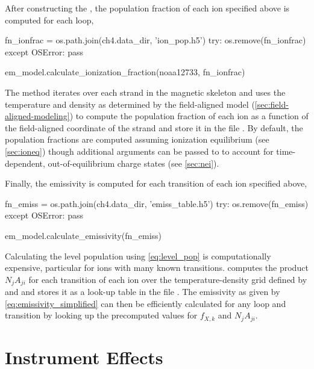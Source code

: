 After constructing the , the population fraction of each ion specified above is computed for each loop,
\begin{pycode}[chapter4]
fn_ionfrac = os.path.join(ch4.data_dir, 'ion_pop.h5')
try:
    os.remove(fn_ionfrac)
except OSError:
    pass
\end{pycode}
\begin{pyblock}[chapter4][baselinestretch=1,xleftmargin=3em]
em_model.calculate_ionization_fraction(noaa12733, fn_ionfrac)
\end{pyblock}
The  method iterates over each strand in the magnetic skeleton and uses the temperature and density as determined by the field-aligned model (\autoref{sec:field-aligned-modeling}) to compute the population fraction of each ion as a function of the field-aligned coordinate of the strand and store it in the file . By default, the population fractions are computed assuming ionization equilibrium (see \autoref{sec:ioneq}) though additional arguments can be passed to  to account for time-dependent, out-of-equilibrium charge states (see \autoref{sec:nei}).

Finally, the emissivity is computed for each transition of each ion specified above,
\begin{pycode}[chapter4]
fn_emiss = os.path.join(ch4.data_dir, 'emiss_table.h5')
try:
    os.remove(fn_emiss)
except OSError:
    pass
\end{pycode}
\begin{pyblock}[chapter4][baselinestretch=1,xleftmargin=3em]
em_model.calculate_emissivity(fn_emiss)
\end{pyblock}
Calculating the level population using \autoref{eq:level_pop} is computationally expensive, particular for ions with many known transitions.  computes the product $N_jA_{ji}$ for each transition of each ion over the temperature-density grid defined by  and  and stores it as a look-up table in the file . The emissivity as given by \autoref{eq:emissivity_simplified} can then be efficiently calculated for any loop and transition by looking up the precomputed values for $f_{X,k}$ and $N_jA_{ji}$.

\section{Instrument Effects}\label{sec:instrument-effects}

